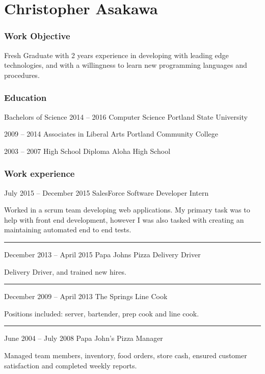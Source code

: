 \documentclass{tccv}
\begin{document}
\part{Christopher Asakawa}

\section{Work Objective}
Fresh Graduate with 2 years experience in developing with leading edge technologies, and with a willingness to learn new programming languages and procedures. 


\section{Education}

\begin{yearlist}

\item[Bachelors of Science]{2014 -- 2016}
     {Computer Science}
     {Portland State University}

\item{2009 -- 2014}
     {Associates in Liberal Arts}
     {Portland Community College}

\item{2003 -- 2007}
     {High School Diploma}
     {Aloha High School}
     
\end{yearlist}


\section{Work experience}

\begin{eventlist}

\item{July 2015 -- December 2015}
     {SalesForce}
     {Software Developer Intern}
     
Worked in a scrum team developing web applications. My primary task was to help with front end development, however I was also tasked with creating an maintaining automated end to end tests.

{\color{light-gray} \noindent\rule{8.7cm}{0.1pt} }
\item{December 2013 -- April 2015}
     {Papa Johns Pizza}
     {Delivery Driver}
     
Delivery Driver, and trained new hires.

{\color{light-gray} \noindent\rule{8.7cm}{0.1pt} }
\item{December 2009 -- April 2013}
     {The Springs}
     {Line Cook}

Positions included: server, bartender, prep cook and line cook.

{\color{light-gray} \noindent\rule{8.7cm}{0.1pt} }
\item{June 2004 -- July 2008}
     {Papa John's Pizza}
     {Manager}
     
Managed team members, inventory, food orders, store cash, ensured customer satisfaction and completed weekly reports.


\end{eventlist}
\end{document}
